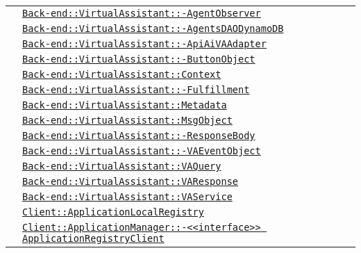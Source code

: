 \begin{longtable}{|>{\centering}m{3cm}|m{10cm}<{\centering}|}
& \hyperref[Back-end::VirtualAssistant::AgentObserver]{\texttt{Back-end::VirtualAssistant::-\linebreak AgentObserver}}\\
& \hyperref[Back-end::VirtualAssistant::AgentsDAODynamoDB]{\texttt{Back-end::VirtualAssistant::-\linebreak AgentsDAODynamoDB}}\\
& \hyperref[Back-end::VirtualAssistant::ApiAiVAAdapter]{\texttt{Back-end::VirtualAssistant::-\linebreak ApiAiVAAdapter}}\\
& \hyperref[Back-end::VirtualAssistant::ButtonObject]{\texttt{Back-end::VirtualAssistant::-\linebreak ButtonObject}}\\
& \hyperref[Back-end::VirtualAssistant::Context]{\texttt{Back-end::VirtualAssistant::Context}}\\
& \hyperref[Back-end::VirtualAssistant::Fulfillment]{\texttt{Back-end::VirtualAssistant::-\linebreak Fulfillment}}\\
& \hyperref[Back-end::VirtualAssistant::Metadata]{\texttt{Back-end::VirtualAssistant::Metadata}}\\
& \hyperref[Back-end::VirtualAssistant::MsgObject]{\texttt{Back-end::VirtualAssistant::MsgObject}}\\
& \hyperref[Back-end::VirtualAssistant::ResponseBody]{\texttt{Back-end::VirtualAssistant::-\linebreak ResponseBody}}\\
& \hyperref[Back-end::VirtualAssistant::VAEventObject]{\texttt{Back-end::VirtualAssistant::-\linebreak VAEventObject}}\\
& \hyperref[Back-end::VirtualAssistant::VAQuery]{\texttt{Back-end::VirtualAssistant::VAQuery}}\\
& \hyperref[Back-end::VirtualAssistant::VAResponse]{\texttt{Back-end::VirtualAssistant::VAResponse}}\\
& \hyperref[Back-end::VirtualAssistant::VAService]{\texttt{Back-end::VirtualAssistant::VAService}}\\
& \hyperref[Client::ApplicationLocalRegistry]{\texttt{Client::ApplicationLocalRegistry}}\\
& \hyperref[Client::ApplicationManager::<<interface>> ApplicationRegistryClient]{\texttt{Client::ApplicationManager::-\linebreak <<interface>> ApplicationRegistryClient}}\\

\end{longtable}
